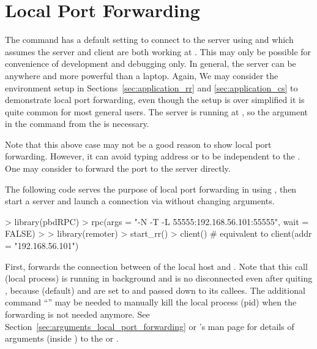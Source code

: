 \section[Local Port Forwarding]{Local Port Forwarding}
\label{sec:local_port_forwarding}

The  command  has a default setting
to connect to the  server using  and
 which assumes the  server and client are
both working at .
This may only be possible for convenience of development and debugging only.
In general, the server can be anywhere and more powerful than a laptop.
Again, We may consider the environment setup in
Sections~\ref{sec:application_rr} and \ref{sec:application_cs} to
demonstrate local port forwarding, even though the setup is over simplified
it is quite common for most general users.
The server is running at , so the argument
 in the 
command  from the 
is necessary.

Note that this above case may not be a good reason to show local port
forwarding.
However, it can avoid typing address or to be independent to the .
One may consider to forward the  port  to the
server directly.

The following code serves the purpose of local port forwarding in
 using , then start a  server and
launch a connection via  without changing arguments.
\begin{Code}[title=Forward \code{localhost:55555} to \code{192.168.56.101:55555}]
> library(pbdRPC)
> rpc(args = "-N -T -L 55555:192.168.56.101:55555", wait = FALSE)
>
> library(remoter)
> start_rr()
> client()    # equivalent to client(addr = "192.168.56.101")
\end{Code}

First, 
forwards the connection between  of the local host and
.
Note that this call (local process) is running in background and is
no disconnected even after quiting ,
because  (default) and {\color{red} }
are set to  and passed down to its callees.
{\color{red}
The additional command ``'' may be needed to manually
kill the local process (pid) when the forwarding is not needed anymore.
}
See Section~\ref{sec:arguments_local_port_forwarding} or
's man page for details of arguments 
(inside ) to the  or .

